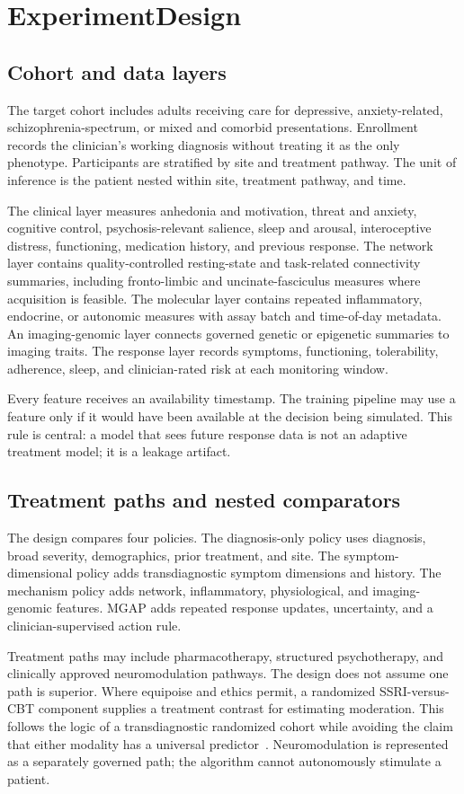 \documentclass[conference]{IEEEtran}
\begin{document}
\section{ExperimentDesign}
\subsection{Cohort and data layers}
The target cohort includes adults receiving care for depressive, anxiety-related, schizophrenia-spectrum, or mixed and comorbid presentations. Enrollment records the clinician's working diagnosis without treating it as the only phenotype. Participants are stratified by site and treatment pathway. The unit of inference is the patient nested within site, treatment pathway, and time.

The clinical layer measures anhedonia and motivation, threat and anxiety, cognitive control, psychosis-relevant salience, sleep and arousal, interoceptive distress, functioning, medication history, and previous response. The network layer contains quality-controlled resting-state and task-related connectivity summaries, including fronto-limbic and uncinate-fasciculus measures where acquisition is feasible. The molecular layer contains repeated inflammatory, endocrine, or autonomic measures with assay batch and time-of-day metadata. An imaging-genomic layer connects governed genetic or epigenetic summaries to imaging traits. The response layer records symptoms, functioning, tolerability, adherence, sleep, and clinician-rated risk at each monitoring window.

Every feature receives an availability timestamp. The training pipeline may use a feature only if it would have been available at the decision being simulated. This rule is central: a model that sees future response data is not an adaptive treatment model; it is a leakage artifact.

\subsection{Treatment paths and nested comparators}
The design compares four policies. The diagnosis-only policy uses diagnosis, broad severity, demographics, prior treatment, and site. The symptom-dimensional policy adds transdiagnostic symptom dimensions and history. The mechanism policy adds network, inflammatory, physiological, and imaging-genomic features. MGAP adds repeated response updates, uncertainty, and a clinician-supervised action rule.

Treatment paths may include pharmacotherapy, structured psychotherapy, and clinically approved neuromodulation pathways. The design does not assume one path is superior. Where equipoise and ethics permit, a randomized SSRI-versus-CBT component supplies a treatment contrast for estimating moderation. This follows the logic of a transdiagnostic randomized cohort while avoiding the claim that either modality has a universal predictor~\cite{thomas2020}. Neuromodulation is represented as a separately governed path; the algorithm cannot autonomously stimulate a patient.
\end{document}
